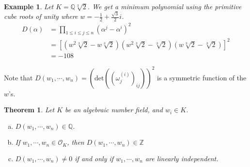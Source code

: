 \documentclass{article}
\newcommand{\Q}{\mathbb{Q}}
\newcommand{\Z}{\mathbb{Z}}
\newtheorem{theorem}{Theorem}[subsection]
\newtheorem{example}{Example}[subsection]
\begin{document}
\begin{example}
Let $K=\Q\sqrt[3]{2}$. We get a minimum polynomial using the primitive cube roots of unity where $w=-\frac{1}{2}+\frac{\sqrt{3}}{2}i$.
\begin{align*}
    D(\alpha)&=\prod_{1\leq i\leq j\leq n}(\alpha^j-\alpha^i)^2\\
    &=[(w^2\sqrt[3]{2}-w\sqrt[3]{2})(w^2\sqrt[3]{2}-\sqrt[3]{2})(w\sqrt[3]{2}-\sqrt[3]{2})]^2\\
    &=-108
\end{align*}
\end{example}
\noindent Note that $D(w_1,\cdots ,w_n)=(\text{det}((\omega_j^{(i)})_{ij}))^2$ is a symmetric function of the $w$'s.
\begin{theorem}
Let $K$ be an algebraic number field, and $w_i\in K$.
\begin{enumerate}[(a)]
    \item $D(w_1,\cdots, w_n)\in\Q$.
    \item If $w_1,\cdots, w_n\in \mathcal{O}_K$, then $D(w_1,\cdots ,w_n)\in\Z$
    \item $D(w_1,\cdots, w_n)\neq 0$ if and only if $w_1,\cdots, w_n$ are linearly independent.
\end{enumerate}
\end{theorem}
\end{document}
